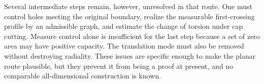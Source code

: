 \documentclass[11pt]{amsart}
\theoremstyle{plain}
\theoremstyle{definition}
\begin{document}
Several intermediate steps remain, however, unresolved in that route. One must control holes meeting the
original boundary, realize the measurable first-crossing profile by an
admissible graph, and estimate the change of torsion under cap cutting.
Measure control alone is insufficient for the last step because a set of
zero area may have positive capacity. The translation mode must also be
removed without destroying radiality. These issues are specific enough to
make the planar route plausible, but they prevent it from being a proof at present, and no comparable all-dimensional construction is known.



\end{document}
